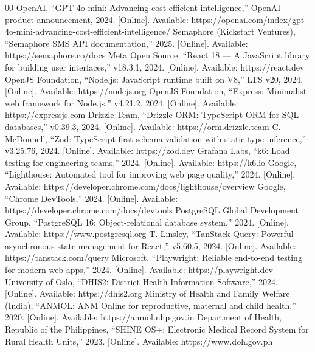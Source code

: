 \documentclass[conference]{IEEEtran}
\begin{document}
\begin{thebibliography}{00}
 OpenAI, ``GPT-4o mini: Advancing cost-efficient intelligence,'' OpenAI product announcement, 2024. [Online]. Available: https://openai.com/index/gpt-4o-mini-advancing-cost-efficient-intelligence/
 Semaphore (Kickstart Ventures), ``Semaphore SMS API documentation,'' 2025. [Online]. Available: https://semaphore.co/docs
 Meta Open Source, ``React 18 --- A JavaScript library for building user interfaces,'' v18.3.1, 2024. [Online]. Available: https://react.dev
 OpenJS Foundation, ``Node.js: JavaScript runtime built on V8,'' LTS v20, 2024. [Online]. Available: https://nodejs.org
 OpenJS Foundation, ``Express: Minimalist web framework for Node.js,'' v4.21.2, 2024. [Online]. Available: https://expressjs.com
 Drizzle Team, ``Drizzle ORM: TypeScript ORM for SQL databases,'' v0.39.3, 2024. [Online]. Available: https://orm.drizzle.team
 C. McDonnell, ``Zod: TypeScript-first schema validation with static type inference,'' v3.25.76, 2024. [Online]. Available: https://zod.dev
 Grafana Labs, ``k6: Load testing for engineering teams,'' 2024. [Online]. Available: https://k6.io
 Google, ``Lighthouse: Automated tool for improving web page quality,'' 2024. [Online]. Available: https://developer.chrome.com/docs/lighthouse/overview
 Google, ``Chrome DevTools,'' 2024. [Online]. Available: https://developer.chrome.com/docs/devtools
 PostgreSQL Global Development Group, ``PostgreSQL 16: Object-relational database system,'' 2024. [Online]. Available: https://www.postgresql.org
 T. Linsley, ``TanStack Query: Powerful asynchronous state management for React,'' v5.60.5, 2024. [Online]. Available: https://tanstack.com/query
 Microsoft, ``Playwright: Reliable end-to-end testing for modern web apps,'' 2024. [Online]. Available: https://playwright.dev
 University of Oslo, ``DHIS2: District Health Information Software,'' 2024. [Online]. Available: https://dhis2.org
 Ministry of Health and Family Welfare (India), ``ANMOL: ANM Online for reproductive, maternal and child health,'' 2020. [Online]. Available: https://anmol.nhp.gov.in
 Department of Health, Republic of the Philippines, ``SHINE OS+: Electronic Medical Record System for Rural Health Units,'' 2023. [Online]. Available: https://www.doh.gov.ph
\end{thebibliography}
\end{document}
